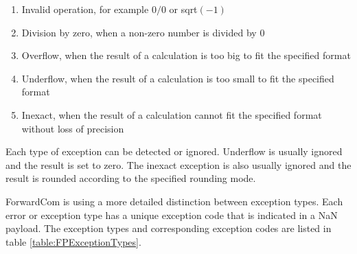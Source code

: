 \documentclass[forwardcom.tex]{subfiles}
\begin{document}
\begin{enumerate}
  \item Invalid operation, for example $0 / 0$ or sqrt$(-1)$
  \item Division by zero, when a non-zero number is divided by 0
  \item Overflow, when the result of a calculation is too big to fit the specified format
  \item Underflow, when the result of a calculation is too small to fit the specified format 
  \item Inexact, when the result of a calculation cannot fit the specified format without loss of precision  
\end{enumerate}

Each type of exception can be detected or ignored. Underflow is usually ignored and the result is set to zero. The inexact exception is also usually ignored and the result is rounded according to the specified rounding mode. 
\vv

ForwardCom is using a more detailed distinction between exception types. Each error or exception type has a unique exception code that is indicated in a NaN payload.
The exception types and corresponding exception codes are listed in table \ref{table:FPExceptionTypes}.
\end{document}
